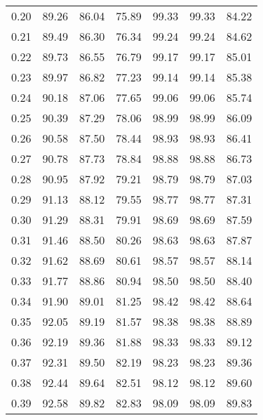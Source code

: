 \begin{tabular}{|c|c|c|c|c|c|c|}
      0.20 &     89.26 &     86.04 &      75.89 &   99.33 &      99.33 &         84.22 \\
      0.21 &     89.49 &     86.30 &      76.34 &   99.24 &      99.24 &         84.62 \\
      0.22 &     89.73 &     86.55 &      76.79 &   99.17 &      99.17 &         85.01 \\
      0.23 &     89.97 &     86.82 &      77.23 &   99.14 &      99.14 &         85.38 \\
      0.24 &     90.18 &     87.06 &      77.65 &   99.06 &      99.06 &         85.74 \\
      0.25 &     90.39 &     87.29 &      78.06 &   98.99 &      98.99 &         86.09 \\
      0.26 &     90.58 &     87.50 &      78.44 &   98.93 &      98.93 &         86.41 \\
      0.27 &     90.78 &     87.73 &      78.84 &   98.88 &      98.88 &         86.73 \\
      0.28 &     90.95 &     87.92 &      79.21 &   98.79 &      98.79 &         87.03 \\
      0.29 &     91.13 &     88.12 &      79.55 &   98.77 &      98.77 &         87.31 \\
      0.30 &     91.29 &     88.31 &      79.91 &   98.69 &      98.69 &         87.59 \\
      0.31 &     91.46 &     88.50 &      80.26 &   98.63 &      98.63 &         87.87 \\
      0.32 &     91.62 &     88.69 &      80.61 &   98.57 &      98.57 &         88.14 \\
      0.33 &     91.77 &     88.86 &      80.94 &   98.50 &      98.50 &         88.40 \\
      0.34 &     91.90 &     89.01 &      81.25 &   98.42 &      98.42 &         88.64 \\
      0.35 &     92.05 &     89.19 &      81.57 &   98.38 &      98.38 &         88.89 \\
      0.36 &     92.19 &     89.36 &      81.88 &   98.33 &      98.33 &         89.12 \\
      0.37 &     92.31 &     89.50 &      82.19 &   98.23 &      98.23 &         89.36 \\
      0.38 &     92.44 &     89.64 &      82.51 &   98.12 &      98.12 &         89.60 \\
      0.39 &     92.58 &     89.82 &      82.83 &   98.09 &      98.09 &         89.83 \\

\end{tabular}
